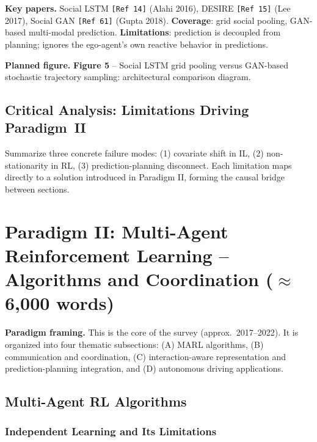 \documentclass[12pt, a4paper]{article}
\begin{document}
\begin{outline_note}
\textbf{Key papers.}
Social LSTM \texttt{[Ref\,14]} (Alahi 2016),
DESIRE \texttt{[Ref\,15]} (Lee 2017),
Social GAN \texttt{[Ref\,61]} (Gupta 2018).
\textbf{Coverage}: grid social pooling, GAN-based multi-modal prediction.
\textbf{Limitations}: prediction is decoupled from planning; ignores
the ego-agent's own reactive behavior in predictions.

\textbf{Planned figure.}
\textbf{Figure 5} -- Social LSTM grid pooling versus GAN-based stochastic
trajectory sampling: architectural comparison diagram.
\end{outline_note}

\subsection{Critical Analysis: Limitations Driving Paradigm~II}

\begin{outline_note}
Summarize three concrete failure modes:
(1) covariate shift in IL, (2) non-stationarity in RL, (3) prediction-planning
disconnect.  Each limitation maps directly to a solution introduced in
Paradigm II, forming the causal bridge between sections.
\end{outline_note}

\section{Paradigm II: Multi-Agent Reinforcement Learning -- Algorithms and Coordination \textnormal{\small ($\approx$6{,}000 words)}}
\label{sec:paradigm2}

\begin{outline_note}
\textbf{Paradigm framing.}
This is the core of the survey (approx.\ 2017--2022).
It is organized into four thematic subsections: (A) MARL algorithms,
(B) communication and coordination, (C) interaction-aware representation
and prediction-planning integration, and (D) autonomous driving applications.
\end{outline_note}

\subsection{Multi-Agent RL Algorithms}
\label{sec:marl_alg}

\subsubsection{Independent Learning and Its Limitations}
\end{document}
